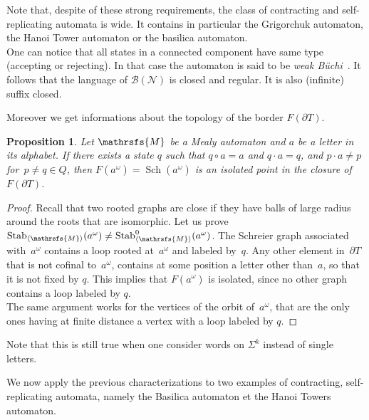 \documentclass{amsart}
\newtheorem{proposition}[theorem]{Proposition}
\begin{document}
Note that, despite of these strong requirements, the class of contracting and self-replicating automata is wide. It contains in particular the Grigorchuk automaton, the Hanoi Tower automaton or the basilica automaton.\\
One can notice that all states in a connected component have same type (accepting or rejecting). In that case the automaton is said to be \emph{weak B\"uchi}~\cite{PerrinPin}. It follows that the language of ${\mathcal{B}({\mathcal{N}})}$ is closed and regular. It is also (infinite) suffix closed.\medskip

Moreover we get informations about the topology of the border $F(\partial T)$. 
\begin{proposition}\label{prop:isol}
Let ${{{\mathrsfs{{M}}}}}$ be a Mealy automaton and $a$ be a letter in its alphabet. If there exists a state $q$ such that $q {{{\circ}}} a = a$ and $q{{{\cdot}}} a = q$,  and $p{{{\cdot}}} a \neq p$ for~$p \neq q \in {{{Q}}}$, then $F(a^{\omega}) = \operatorname{Sch}(a^{\omega})$ is an isolated point in the closure of~$F(\partial T)$. \\
\end{proposition}
\begin{proof}
 Recall that two rooted graphs are close if they have balls of large radius around the roots that are isomorphic. Let us prove~$\operatorname{Stab}_{{{\langle}{{\mathrsfs{{{M}}}}}{\rangle}}}(a^{\omega})\neq\operatorname{Stab}_{{{\langle}{{\mathrsfs{{{M}}}}}{\rangle}}}^{0}(a^{\omega})$. The Schreier graph associated with~$a^{\omega}$ contains a loop rooted at~$a^{\omega}$ and labeled by~$q$. Any other element in~$\partial T$ that is not cofinal to~$a^{\omega}$, contains at some position a letter other than~$a$, so that it is not fixed by $q$. This implies that $F(a^\omega)$ is isolated, since no other graph contains a loop labeled by $q$.\\ 
The same argument works for the vertices of the orbit of~$a^{\omega}$, that are the only ones having at finite distance a vertex with a loop labeled by $q$.
\end{proof}
Note that this is still true when one consider words on ${{{\Sigma}}}^k$ instead of single letters.

We now apply the previous characterizations to two examples of contracting, self-replicating automata, namely the Basilica automaton et the Hanoi Towers automaton.
\end{document}
